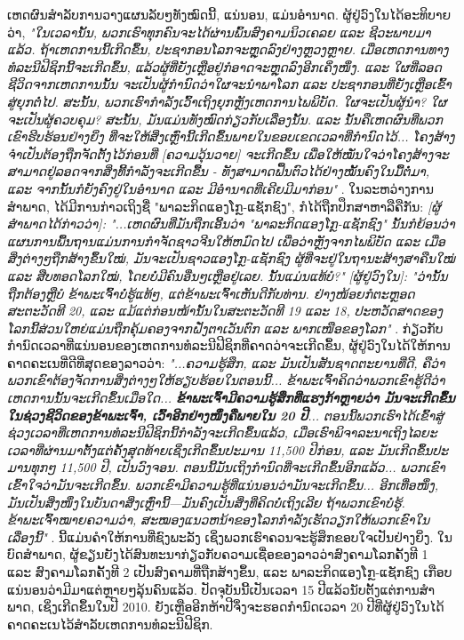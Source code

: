 \documentclass[10pt,twocolumn,letterpaper]{article}
\begin{document}
ເຫດຜົນສໍາລັບການວາງແຜນລັບໆທັງໝົດນີ້, ແນ່ນອນ, ແມ່ນອຳນາດ.
ຜູ້ຢູ່ວົງໃນໄດ້ອະທິບາຍວ່າ, \textit{"ໃນເວລານັ້ນ, ພວກເຮົາທຸກຄົນຈະໄດ້ຜ່ານພົ້ນສົງຄາມນິວເຄລຍ ແລະ ຊີວະພາບມາແລ້ວ. ຖ້າເຫດການນີ້ເກີດຂຶ້ນ, ປະຊາກອນໂລກຈະຫຼຸດລົງຢ່າງຫຼວງຫຼາຍ. ເມື່ອເຫດການທາງທໍລະນີຟີຊິກນີ້ຈະເກີດຂຶ້ນ, ແລ້ວຜູ້ທີ່ຍັງເຫຼືອຢູ່ກໍອາດຈະຫຼຸດລົງອີກເຄິ່ງໜຶ່ງ. ແລະ ໃຜທີ່ລອດຊີວິດຈາກເຫດການນັ້ນ ຈະເປັນຜູ້ກໍານົດວ່າໃຜຈະນຳພາໂລກ ແລະ ປະຊາກອນທີ່ຍັງເຫຼືອເຂົ້າສູ່ຍຸກຕໍ່ໄປ. ສະນັ້ນ, ພວກເຮົາກຳລັງເວົ້າເຖິງຍຸກຫຼັງເຫດການໄພພິບັດ. ໃຜຈະເປັນຜູ້ນຳ? ໃຜຈະເປັນຜູ້ຄວບຄຸມ? ສະນັ້ນ, ມັນແມ່ນທັງໝົດກ່ຽວກັບເລື່ອງນັ້ນ. ແລະ ນັ້ນຄືເຫດຜົນທີ່ພວກເຂົາຮີບຮ້ອນຢ່າງຍິ່ງ ທີ່ຈະໃຫ້ສິ່ງເຫຼົ່ານີ້ເກີດຂຶ້ນພາຍໃນຂອບເຂດເວລາທີ່ກຳນົດໄວ້... ໂຄງສ້າງຈຳເປັນຕ້ອງຖືກຈັດຕັ້ງໄວ້ກ່ອນທີ່ [ຄວາມວຸ້ນວາຍ] ຈະເກີດຂຶ້ນ ເພື່ອໃຫ້ໝັ່ນໃຈວ່າໂຄງສ້າງຈະສາມາດຢູ່ລອດຈາກສິ່ງທີ້ກຳລັງຈະເກີດຂື້ນ - ທັງສາມາດຟື້ນຕົວໄດ້ຢ່າງໝັ້ນຄົງໃນມື້ຕໍ່ມາ, ແລະ ຈາກນັ້ນກໍຍັງຄົງຢູ່ໃນອຳນາດ ແລະ ມີອຳນາດທີ່ເຄີຍມີມາກ່ອນ"} \cite{4}.
ໃນລະຫວ່າງການສຳພາດ, ໄດ້ມີການກ່າວເຖິງຊື່ "ພາລະກິດແອງໂກຼ-ແຊັກຊົງ", ກໍໄດ້ຖືກປຶກສາຫາລືຄືກັນ: \textit{[ຜູ້ສຳພາດໄດ້ກ່າວວ່າ]: "...ເຫດຜົນທີ່ມັນຖືກເອີ້ນວ່າ "ພາລະກິດແອງໂກຼ-ແຊັກຊົງ" ນັ້ນກໍຍ້ອນວ່າແຜນການພື້ນຖານແມ່ນການກຳຈັດຊາວຈີນໃຫ້ຫມົດໄປ ເພື່ອວ່າຫຼັງຈາກໄພພິບັດ ແລະ ເມື່ອສິ່ງຕ່າງໆຖືກສ້າງຂຶ້ນໃໝ່, ມັນຈະເປັນຊາວແອງໂກຼ-ແຊັກຊົງ ຜູ້ທີ່ຈະຢູ່ໃນຖານະສ້າງສາຄືນໃໝ່ ແລະ ສືບທອດໂລກໃໝ່, ໂດຍບໍ່ມີຄົນອື່ນໆເຫຼືອຢູ່ເລຍ. ນັ້ນແມ່ນແທ້ບໍ?"}
\textit{[ຜູ້ຢູ່ວົງໃນ]: "ວ່ານັ້ນຖືກຕ້ອງຫຼືບໍ ຂ້າພະເຈົ້າບໍ່ຮູ້ແທ້ໆ, ແຕ່ຂ້າພະເຈົ້າເຫັນດີກັບທ່ານ. ຢ່າງໜ້ອຍກໍຕະຫຼອດສະຕະວັດທີ 20, ແລະ ແມ້ແຕ່ກ່ອນໜ້ານັ້ນໃນສະຕະວັດທີ 19 ແລະ 18, ປະຫວັດສາດຂອງໂລກນີ້ສ່ວນໃຫຍ່ແມ່ນຖືກຄຸ້ມຄອງຈາກຝັ່ງຕາເວັນຕົກ ແລະ ພາກເໜືອຂອງໂລກ"} \cite{4}. 
ກ່ຽວກັບກຳນົດເວລາທີ່ແນ່ນອນຂອງເຫດການທໍລະນີຟີຊິກທີ່ຄາດວ່າຈະເກີດຂຶ້ນ, ຜູ້ຢູ່ວົງໃນໄດ້ໃຫ້ການຄາດຄະເນທີ່ດີທີ່ສຸດຂອງລາວວ່າ: \textit{"...ຄວາມຮູ້ສຶກ, ແລະ ມັນເປັນສັນຊາດຕະຍານທີ່ດີ, ຄືວ່າພວກເຂົາຕ້ອງຈັດການສິ່ງຕ່າງໆໃຫ້ຮຽບຮ້ອຍໃນຕອນນີ້... ຂ້າພະເຈົ້າຄິດວ່າພວກເຂົາຮູ້ດີວ່າເຫດການນັ້ນຈະເກີດຂຶ້ນເມື່ອໃດ... \textbf{ຂ້າພະເຈົ້າມີຄວາມຮູ້ສຶກທີ່ແຮງກ້າຫຼາຍວ່າ ມັນຈະເກີດຂຶ້ນໃນຊ່ວງຊີວິດຂອງຂ້າພະເຈົ້າ, ເວົ້າອີກຢ່າງໜຶ່ງຄືພາຍໃນ 20 ປີ}... ຕອນນີ້ພວກເຮົາໄດ້ເຂົ້າສູ່ຊ່ວງເວລາທີ່ເຫດການທໍລະນີຟີຊິກນີ້ກຳລັງຈະເກີດຂຶ້ນແລ້ວ, ເມື່ອເຮົາພິຈາລະນາເຖິງໄລຍະເວລາທີ່ຜ່ານມາຕັ້ງແຕ່ຄັ້ງສຸດທ້າຍເຊິ່ງເກີດຂຶ້ນປະມານ 11,500 ປີກ່ອນ, ແລະ ມັນເກີດຂຶ້ນປະມານທຸກໆ 11,500 ປີ, ເປັນວົງຈອນ. ຕອນນີ້ມັນເຖິງກຳນົດທີ່ຈະເກີດຂຶ້ນອີກແລ້ວ... ພວກເຂົາເຂົ້າໃຈວ່າມັນຈະເກີດຂຶ້ນ. ພວກເຂົາມີຄວາມຮູ້ທີ່ແນ່ນອນວ່າມັນຈະເກີດຂຶ້ນ... ອີກເທື່ອໜຶ່ງ, ມັນເປັນສິ່ງໜຶ່ງໃນບັນດາສິ່ງເຫຼົ່ານີ້—ມັນຄົງເປັນສິ່ງທີ່ຄິດບໍ່ເຖິງເລີຍ ຖ້າພວກເຂົາບໍ່ຮູ້. ຂ້າພະເຈົ້າໝາຍຄວາມວ່າ, ສະໝອງແນວຫນ້າຂອງໂລກກຳລັງເຮັດວຽກໃຫ້ພວກເຂົາໃນເລື່ອງນີ້"} \cite{4}. 
ນີ້ແມ່ນຄຳໃຫ້ການທີ່ຊົງພະລັງ ເຊິ່ງພວກເຮົາຄວນຈະຮູ້ສຶກຂອບໃຈເປັນຢ່າງຍິ່ງ. ໃນບົດສໍາພາດ, ຜູ້ຂຽນຍັງໄດ້ສົນທະນາກ່ຽວກັບຄວາມເຊື່ອຂອງລາວວ່າສົງຄາມໂລກຄັ້ງທີ 1 ແລະ ສົງຄາມໂລກຄັ້ງທີ 2 ເປັນສົງຄາມທີ່ຖືກສ້າງຂຶ້ນ, ແລະ ພາລະກິດແອງໂກຼ-ແຊັກຊົງ ເກືອບແນ່ນອນວ່າມີມາແຕ່ຫຼາຍໆລຸ້ນຄົນແລ້ວ. ປັດຈຸບັນນີ້ເປັນເວລາ 15 ປີແລ້ວນັບຕັ້ງແຕ່ການສໍາພາດ, ເຊິ່ງເກີດຂຶ້ນໃນປີ 2010. ຍັງເຫຼືອອີກຫ້າປີຈຶ່ງຈະຮອດກຳນົດເວລາ 20 ປີທີ່ຜູ້ຢູ່ວົງໃນໄດ້ຄາດຄະເນໄວ້ສຳລັບເຫດການທໍລະນີຟີຊິກ.
\end{document}

